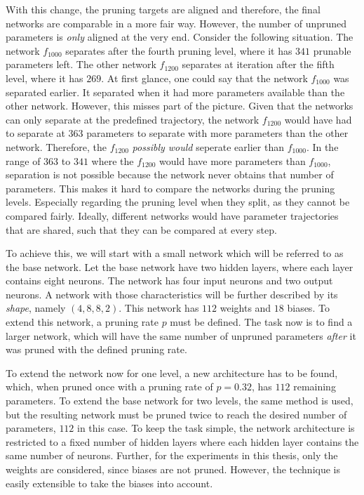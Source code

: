 With this change, the pruning targets are aligned and therefore, the final networks are comparable in a more fair way.
However, the number of unpruned parameters is \textit{only} aligned at the very end.
Consider the following situation.
The network $f_{1000}$ separates after the fourth pruning level, where it has $341$ prunable parameters left. 
The other network $f_{1200}$ separates at iteration after the fifth level, where it has $269$.
At first glance, one could say that the network $f_{1000}$ was separated earlier.
It separated when it had more parameters available than the other network.
However, this misses part of the picture.
Given that the networks can only separate at the predefined trajectory, the network $f_{1200}$ would have had to separate at $363$ parameters to separate with more parameters than the other network.
Therefore, the $f_{1200}$ \textit{possibly would} seperate earlier than $f_{1000}$.
In the range of $363$ to $341$ where the $f_{1200}$ would have more parameters than $f_{1000}$, separation is not possible because the network never obtains that number of parameters.
This makes it hard to compare the networks during the pruning levels.
Especially regarding the pruning level when they split, as they cannot be compared fairly.
Ideally, different networks would have parameter trajectories that are shared, such that they can be compared at every step.

To achieve this, we will start with a small network which will be referred to as the base network.
Let the base network have two hidden layers, where each layer contains eight neurons.
The network has four input neurons and two output neurons.
A network with those characteristics will be further described by its \textit{shape}, namely $(4, 8, 8, 2)$.
This network has $112$ weights and $18$ biases.
To extend this network, a pruning rate $p$ must be defined.
The task now is to find a larger network, which will have the same number of unpruned parameters \textit{after} it was pruned with the defined pruning rate.

To extend the network now for one level, a new architecture has to be found, which, when pruned once with a pruning rate of $p=0.32$, has $112$ remaining parameters.
To extend the base network for two levels, the same method is used, but the resulting network must be pruned twice to reach the desired number of parameters, $112$ in this case.
To keep the task simple, the network architecture is restricted to a fixed number of hidden layers where each hidden layer contains the same number of neurons.
Further, for the experiments in this thesis, only the weights are considered, since biases are not pruned.
However, the technique is easily extensible to take the biases into account.

